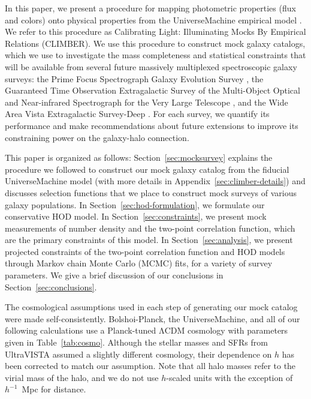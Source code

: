 \documentclass[twocolumn,twocolappendix]{aastex63}
\newcommand{\lcdm}{$\mathrm{\Lambda}$CDM}
\begin{document}
In this paper, we present a procedure for mapping photometric properties (flux and colors) onto physical properties from the UniverseMachine empirical model \citep{Behroozi:2019}. We refer to this procedure as Calibrating Light: Illuminating Mocks By Empirical Relations (CLIMBER). We use this procedure to construct mock galaxy catalogs, which we use to investigate the mass completeness and statistical constraints that will be available from several future massively multiplexed spectroscopic galaxy surveys: the Prime Focus Spectrograph Galaxy Evolution Survey \citep[PFS;][]{Takada:2014}, the Guaranteed Time Observation Extragalactic Survey of the Multi-Object Optical and Near-infrared Spectrograph for the Very Large Telescope \citep[MOONS;][]{Maiolino:2020}, and the Wide Area Vista Extragalactic Survey-Deep \citep[WAVES;][]{Driver:2016}. For each survey, we quantify its performance and make recommendations about future extensions to improve its constraining power on the galaxy-halo connection.

This paper is organized as follows: Section~\ref{sec:mocksurvey} explains the procedure we followed to construct our mock galaxy catalog from the fiducial UniverseMachine model (with more details in Appendix~\ref{sec:climber-details}) and discusses selection functions that we place to construct mock surveys of various galaxy populations. In Section~\ref{sec:hod-formulation}, we formulate our conservative HOD model. In Section~\ref{sec:constraints}, we present mock measurements of number density and the two-point correlation function, which are the primary constraints of this model. In Section~\ref{sec:analysis}, we present projected constraints of the two-point correlation function and HOD models through Markov chain Monte Carlo (MCMC) fits, for a variety of survey parameters. We give a brief discussion of our conclusions in Section~\ref{sec:conclusions}.

The cosmological assumptions used in each step of generating our mock catalog were made self-consistently. Bolshoi-Planck, the UniverseMachine, and all of our following calculations use a Planck-tuned \lcdm{} cosmology with parameters given in Table~\ref{tab:cosmo}. Although the stellar masses and SFRs from UltraVISTA \citep{Muzzin:2013} assumed a slightly different cosmology, their dependence on $h$ has been corrected to match our assumption. Note that all halo masses refer to the virial mass of the halo, and we do not use $h$-scaled units with the exception of $h^{-1}$~Mpc for distance.
\end{document}
